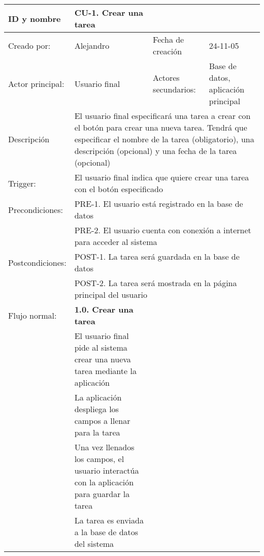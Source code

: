 \begin{center}
\begin{tabular}{p{3cm}p{5cm}p{4cm}p{2cm}}
  \hline
  ID y nombre & CU-1. Crear una tarea & & \\
  \hline
  Creado por: & Alejandro & Fecha de creaci\'on & 24-11-05\\
  \hline
  Actor principal: & Usuario final & Actores secundarios: & Base de datos, aplicaci\'on principal\\
  \hline
  Descripci\'on & \multicolumn{3}{p{11cm}}{El usuario final especificar\'a una tarea a crear con el bot\'on para crear una nueva tarea. Tendr\'a que especificar el nombre de la tarea (obligatorio), una descripci\'on (opcional) y una fecha de la tarea (opcional)}\\
  \hline
  Trigger: & \multicolumn{3}{p{11cm}}{El usuario final indica que quiere crear una tarea con el bot\'on especificado}\\
  \hline
  Precondiciones: & \multicolumn{3}{p{11cm}}{PRE-1. El usuario est\'a registrado en la base de datos}\\
		  & \multicolumn{3}{p{11cm}}{PRE-2. El usuario cuenta con conexi\'on a internet para acceder al sistema}\\
  \hline
  Postcondiciones: & \multicolumn{3}{p{11cm}}{POST-1. La tarea ser\'a guardada en la base de datos}\\
		   & \multicolumn{3}{p{11cm}}{POST-2. La tarea ser\'a mostrada en la p\'agina principal del usuario}\\
  \hline
  Flujo normal: & \textbf{1.0. Crear una tarea}\\
		& El usuario final pide al sistema crear una nueva tarea mediante la aplicaci\'on\\
		& La aplicaci\'on despliega los campos a llenar para la tarea\\
		& Una vez llenados los campos, el usuario interact\'ua con la aplicaci\'on para guardar la tarea\\
		& La tarea es enviada a la base de datos del sistema\\
  \hline
\end{tabular}
\end{center}

